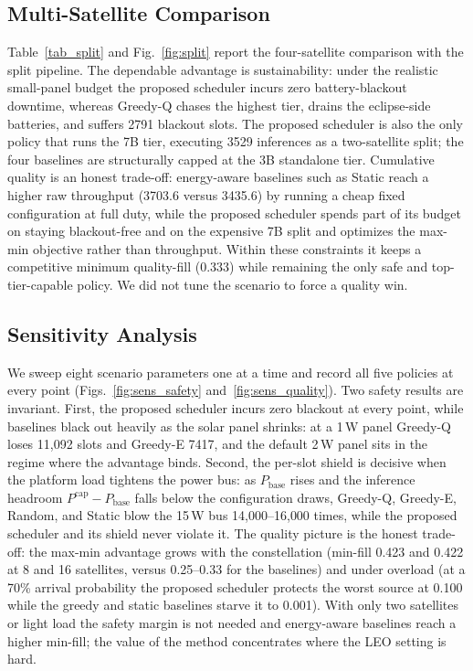 \subsection{Multi-Satellite Comparison}\label{EV_MULTI}
Table~\ref{tab_split} and Fig.~\ref{fig:split} report the four-satellite comparison with the split
pipeline. The dependable advantage is sustainability: under the realistic small-panel budget the
proposed scheduler incurs zero battery-blackout downtime, whereas Greedy-Q chases the highest tier,
drains the eclipse-side batteries, and suffers 2791 blackout slots. The proposed scheduler is also
the only policy that runs the 7B tier, executing 3529 inferences as a two-satellite split; the four
baselines are structurally capped at the 3B standalone tier. Cumulative quality is an honest
trade-off: energy-aware baselines such as Static reach a higher raw throughput (3703.6 versus
3435.6) by running a cheap fixed configuration at full duty, while the proposed scheduler spends
part of its budget on staying blackout-free and on the expensive 7B split and optimizes the max-min
objective rather than throughput. Within these constraints it keeps a competitive minimum
quality-fill (0.333) while remaining the only safe and top-tier-capable policy. We did not tune the
scenario to force a quality win.

\subsection{Sensitivity Analysis}\label{EV_SENS}
We sweep eight scenario parameters one at a time and record all five policies at every point
(Figs.~\ref{fig:sens_safety} and~\ref{fig:sens_quality}). Two safety results are invariant. First,
the proposed scheduler incurs zero blackout at every point, while baselines black out heavily as
the solar panel shrinks: at a 1\,W panel Greedy-Q loses 11{,}092 slots and Greedy-E 7417, and the
default 2\,W panel sits in the regime where the advantage binds. Second, the per-slot shield is
decisive when the platform load tightens the power bus: as $P_{\text{base}}$ rises and the inference
headroom $P^{\text{cap}}{-}P_{\text{base}}$ falls below the configuration draws, Greedy-Q, Greedy-E,
Random, and Static blow the 15\,W bus 14{,}000--16{,}000 times, while the proposed scheduler and its
shield never violate it. The quality picture is the honest trade-off: the max-min advantage grows
with the constellation (min-fill 0.423 and 0.422 at 8 and 16 satellites, versus 0.25--0.33 for the
baselines) and under overload (at a 70\% arrival probability the proposed scheduler protects the
worst source at 0.100 while the greedy and static baselines starve it to 0.001). With only two
satellites or light load the safety margin is not needed and energy-aware baselines reach a higher
min-fill; the value of the method concentrates where the LEO setting is hard.

